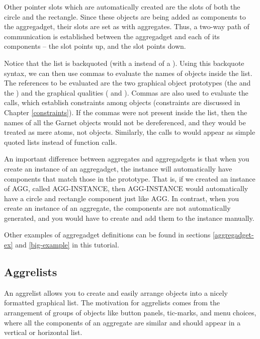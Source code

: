 Other pointer slots which are automatically created are the
 slots of both the circle and the rectangle.  Since these
objects are being added as components to the aggregadget, their
 slots are set as with aggregates.  Thus, a two-way path
of communication is established between the aggregadget and each of
its components -- the  slot points up, and the
 slot points down.

Notice that the  list is backquoted
(with a  instead of a ).  Using this backquote syntax, we can then
use commas to evaluate the names of objects inside the list.  The
references to be evaluated are the two graphical object prototypes (the
 and the ) and the graphical
qualities ( and ).
Commas are also used to evaluate the  calls, which
establish constraints among objects (constraints are discussed
in Chapter \ref{constraints}).  If the commas were not present inside
the  list, then the names of all the Garnet objects would not be
dereferenced, and they would be treated as mere atoms, not objects.
Similarly, the calls to  would appear as simple quoted
lists instead of function calls.

An important difference between aggregates and aggregadgets is that
when you create an instance of an aggregadget, the instance will
automatically have components that match those in the prototype.  That
is, if we created an instance of AGG, called AGG-INSTANCE, then
AGG-INSTANCE would automatically have a circle and rectangle component
just like AGG.  In contrast, when you create an instance of an
aggregate, the components are not automatically generated, and you
would have to create and add them to the instance manually.

Other examples of aggregadget definitions
can be found in sections \ref{aggregadget-ex} and \ref{big-example} in
this tutorial.

\subsection{Aggrelists}

An aggrelist allows you to create and easily arrange objects into a
nicely formatted graphical list.  The motivation for aggrelists comes
from the arrangement of groups of objects like button panels,
tic-marks, and menu choices, where all the components of an aggregate
are similar and should appear in a vertical or horizontal list.

